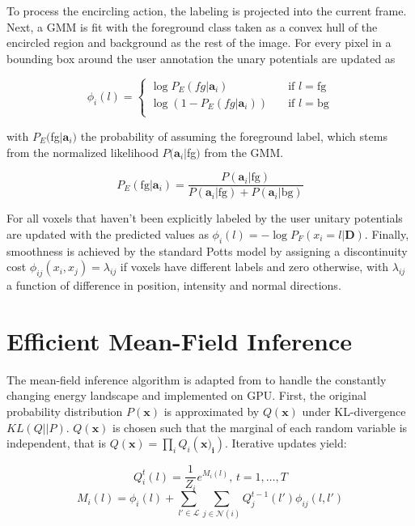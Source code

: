 \documentclass{llncs}
\begin{document}
  To process the encircling action, the labeling is projected into the current frame. Next, a GMM is fit with the foreground class taken as a convex hull of the encircled region and background as the rest of the image. For every pixel in a bounding box around the user annotation the unary potentials are updated as 

  \begin{equation}
  \phi_i(l) =
    \begin{cases}
      \log P_E(fg|\mathbf{a}_i)       & \quad \text{if } l = \text{fg}\\
      \log (1 - P_E(fg|\mathbf{a}_i))  & \quad \text{if } l = \text{bg}\\
    \end{cases}
  \end{equation}

  with $P_E($fg$|\mathbf{a}_i)$ the probability of assuming the foreground label, which stems from the normalized likelihood $P(\mathbf{a}_i|$fg$)$ from the GMM.

  \begin{equation}
    P_E(\text{fg}|\mathbf{a}_i) = \frac{P(\mathbf{a}_i|\text{fg}) }{P(\mathbf{a}_i|\text{fg}) + P(\mathbf{a}_i|\text{bg})}
  \end{equation}

  For all voxels that haven't been explicitly labeled by the user unitary potentials are updated with the predicted values as $\phi_i(l) = -\log P_F(x_i = l | \mathbf{D})$. Finally, smoothness is achieved by the standard Potts model by assigning a discontinuity cost $\phi_{ij}(x_i, x_j) = \lambda_{ij}$ if voxels have different labels and zero otherwise, with $\lambda_{ij}$ a function of difference in position, intensity and normal directions.

\section{Efficient Mean-Field Inference}

The mean-field inference algorithm is adapted from \cite{inference} to handle the constantly changing energy landscape and implemented on GPU. First, the original probability distribution $P(\mathbf{x})$ is approximated by $Q(\mathbf{x})$ under KL-divergence $KL(Q||P)$.  $Q(\mathbf{x})$ is chosen such that the marginal of each random variable is independent, that is $Q(\mathbf{x}) = \prod_i Q_i(\mathbf{x)_i})$. Iterative updates yield:

\begin{equation}
 Q_i^t(l) = \frac{1}{Z_i}e^{M_i(l)} \text{, } t = 1, \ldots, T
\end{equation}
\begin{equation}
 M_i(l) = \phi_i(l) + \sum_{l' \in \mathcal{L}} \sum_{j \in \mathcal{N}(i)} Q_j^{t-1}(l')\phi_{ij}(l, l')
\end{equation}
\end{document}
